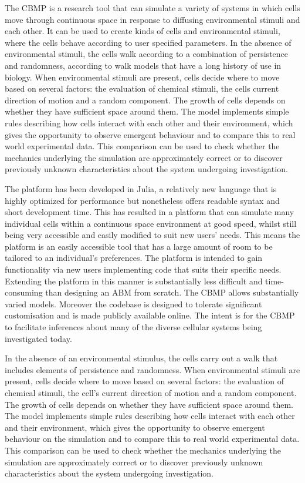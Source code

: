 \documentclass[12pt]{article}
\begin{document}
The CBMP is a research tool that can simulate a variety of systems in which cells move through continuous 
space in response to diffusing environmental stimuli and each other. It can be used to create kinds of 
cells and environmental stimuli, where the cells behave according to user specified parameters. In the absence 
of environmental stimuli, the cells walk according to a combination of persistence and 
randomness, according to walk models that have a long history of use in biology.\cite{codling08} 
When environmental stimuli are present, cells decide where to move based on several factors: 
the evaluation of chemical stimuli, the cells current direction of motion and a random component. The 
growth of cells depends on whether they have sufficient space around them. The model implements simple 
rules describing how cells interact with each other and their environment, which gives the opportunity 
to observe emergent behaviour and to compare this to real world experimental data. This comparison can 
be used to check whether the mechanics underlying the simulation are approximately correct or to discover 
previously unknown characteristics about the system undergoing investigation.

The platform has been developed in Julia, a relatively new language that is highly optimized for performance 
but nonetheless offers readable syntax and short development time. This has resulted in a platform that 
can simulate many individual cells within a continuous space environment at good speed, whilst still 
being very accessible and easily modified to suit new users’ needs. This means the platform is an easily 
accessible tool that has a large amount of room to be tailored to an individual's preferences. The platform 
is intended to gain functionality via new users implementing code that suits their specific needs. Extending 
the platform in this manner is substantially less difficult and time-consuming than designing an ABM 
from scratch. The CBMP allows substantially varied models. Moreover the codebase is designed to tolerate 
significant customisation and is made publicly available online. The intent is for the CBMP to facilitate 
inferences about many of the diverse cellular systems being investigated today.

In the absence of an environmental stimulus, the cells carry out a walk 
that includes elements of persistence and randomness. When environmental 
stimuli are present, cells decide where to move based on several 
factors: the evaluation of chemical stimuli, the cell's current 
direction of motion and a random component. The growth of cells depends 
on whether they have sufficient space around them. The model implements 
simple rules describing how cells interact with each other and their 
environment, which gives the opportunity to observe emergent behaviour 
on the simulation and to compare this to real world experimental data. 
This comparison can be used to check whether the mechanics underlying 
the simulation are approximately correct or to discover previously 
unknown characteristics about the system undergoing investigation.
\end{document}
